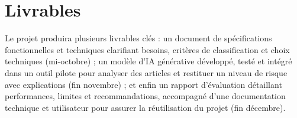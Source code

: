 \section{Livrables}

Le projet produira plusieurs livrables clés : un document de spécifications fonctionnelles et techniques clarifiant
besoins, critères de classification et choix techniques (mi-octobre) ; un modèle d’IA générative développé, testé et
intégré dans un outil pilote pour analyser des articles et restituer un niveau de risque avec explications
(fin novembre) ; et enfin un rapport d’évaluation détaillant performances, limites et recommandations, accompagné
d’une documentation technique et utilisateur pour assurer la réutilisation du projet (fin décembre).

